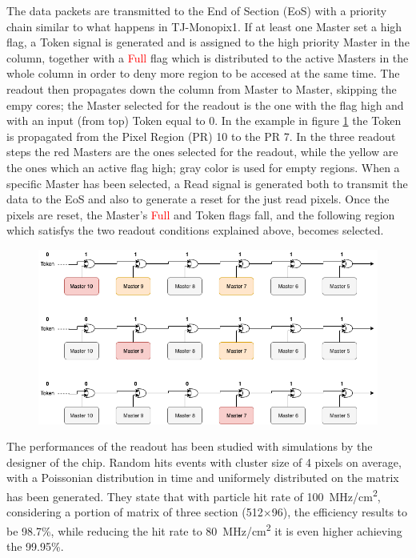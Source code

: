         The data packets are transmitted to the End of Section (EoS) with a priority chain similar to what happens in TJ-Monopix1. 
        If at least one Master set a high flag, a \textcolor{Cerulean}{Token} signal is generated and is assigned to the high priority Master in the column, together with a \textcolor{red}{Full} flag which is distributed to the active Masters in the whole column in order to deny more region to be accesed at the same time.
        The readout then propagates down the column from Master to Master, skipping the empy cores; the Master selected for the readout is the one with the flag high and with an input (from top) \textcolor{Cerulean}{Token} equal to 0. 
        In the example in figure \ref{fig:token_chain} the \textcolor{Cerulean}{Token} is propagated from the Pixel Region (PR) 10 to the PR 7. 
        In the three readout steps the red Masters are the ones selected for the readout, while the yellow are the ones which an active flag high; gray color is used for empty regions. When a specific Master has been selected, a \textcolor{Cerulean}{Read} signal is generated both to transmit the data to the EoS and also to generate a reset for the just read pixels.
        Once the pixels are reset, the Master's \textcolor{red}{Full} 
        and \textcolor{Cerulean}{Token} flags fall, and the following region which satisfys the two readout conditions explained above, becomes selected. 
        \begin{figure}[h!]
            \centering
            \includegraphics[width=.95\linewidth]{figures/ARCADIA/token_chain.png}
            \caption{}
            \label{fig:token_chain}
        \end{figure}

    The performances of the readout has been studied with simulations by the designer of the chip. 
    Random hits events with cluster size of 4 pixels on average, with a Poissonian distribution in time and uniformely distributed on the matrix has been generated.
    They state that with particle hit rate of \SI{100}{MHz/cm\squared}, considering a portion of matrix of three section (512$\times$96), the efficiency results to be 98.7\%, while reducing the hit rate to \SI{80}{MHz/cm\squared} it is even higher achieving the 99.95\%. 